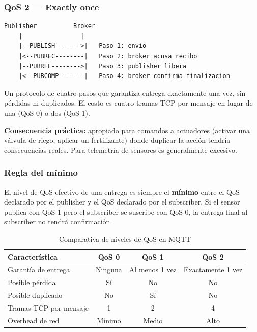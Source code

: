 \documentclass[12pt,a4paper]{article}
\begin{document}
\subsubsection{QoS 2 — Exactly once}

\begin{lstlisting}[style=texto]
Publisher          Broker
    |                |
    |--PUBLISH------->|   Paso 1: envio
    |<--PUBREC--------|   Paso 2: broker acusa recibo
    |--PUBREL-------->|   Paso 3: publisher libera
    |<--PUBCOMP-------|   Paso 4: broker confirma finalizacion
\end{lstlisting}

Un protocolo de cuatro pasos que garantiza entrega exactamente una vez, sin
pérdidas ni duplicados. El costo es cuatro tramas TCP por mensaje en lugar de
una (QoS 0) o dos (QoS 1).

\textbf{Consecuencia práctica:} apropiado para comandos a actuadores (activar
una válvula de riego, aplicar un fertilizante) donde duplicar la acción tendría
consecuencias reales. Para telemetría de sensores es generalmente excesivo.

\subsubsection{Regla del mínimo}

El nivel de QoS efectivo de una entrega es siempre el \textbf{mínimo} entre
el QoS declarado por el publisher y el QoS declarado por el subscriber. Si el
sensor publica con QoS 1 pero el subscriber se suscribe con QoS 0, la entrega
final al subscriber no tendrá confirmación.

\begin{table}[h]
\centering
\begin{tabular}{lccc}
\toprule
\textbf{Característica}   & \textbf{QoS 0} & \textbf{QoS 1} & \textbf{QoS 2} \\
\midrule
Garantía de entrega       & Ninguna         & Al menos 1 vez  & Exactamente 1 vez \\
Posible pérdida           & Sí              & No              & No \\
Posible duplicado         & No              & Sí              & No \\
Tramas TCP por mensaje    & 1               & 2               & 4 \\
Overhead de red           & Mínimo          & Medio           & Alto \\
\bottomrule
\end{tabular}
\caption{Comparativa de niveles de QoS en MQTT}
\end{table}
\end{document}
